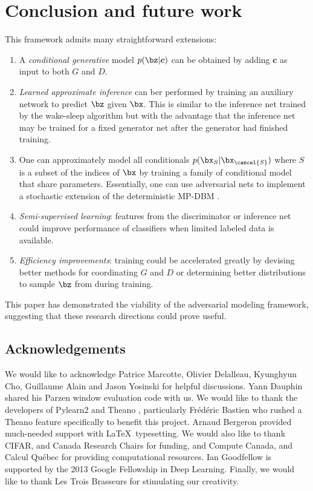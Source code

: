 \section{Conclusion and future work}

This framework admits many straightforward extensions:

\begin{enumerate}
	\item A \emph{conditional generative} model $p(\bz | \boldsymbol{c})$ can be obtained by adding $\boldsymbol{c}$ as input to both $G$ and $D$.
	\item \emph{Learned approximate inference} can ber performed by training an auxiliary network to predict $\bz$ given $\bx$. This is similar to the inference net trained by the wake-sleep algorithm \cite{15_doi:10.1126/science.7761831} but with the advantage that the inference net may be trained for a fixed generator net after the generator had finished training.
	\item One can approximately model all conditionals $p(\bx_S | \bx_{\cancel{S}})$
	where $S$ is a subset of the indices of $\bx$ by training a family of conditional model that share parameters. Essentially, one can use adversarial nets to implement a stochastic extension of the deterministic MP-DBM \cite{11_NIPS2013_0bb4aec1}.
	\item \emph{Semi-supervised learning}: features from the discriminator or inference net could improve performance of classifiers when limited labeled data is available.
	\item \emph{Efficiency improvements}: training could be accelerated greatly by devising better methods for coordinating $G$ and $D$ or determining better distributions to sample $\bz$ from during training.
\end{enumerate}

This paper has demonstrated the viability of the adversarial modeling framework, suggesting that these research directions could prove useful.

\subsection*{Acknowledgements}

We would like to acknowledge Patrice Marcotte, Olivier Delalleau, Kyunghyun Cho, Guillaume Alain and Jason Yosinski for helpful discussions. Yann Dauphin shared his Parzen window evaluation code with us. We would like to thank the developers of Pylearn2 \cite{12_goodfellow2013pylearn2machinelearningresearch} and Theano \cite{7_bergstra-proc-scipy-2010,1_bastien2012theanonewfeaturesspeed}, particularly Frédéric Bastien who rushed a Theano feature specifically to benefit this project. Arnaud Bergeron provided much-needed support with \LaTeX\ typesetting.  We would also like to thank CIFAR, and Canada Research Chairs for funding, and Compute Canada, and Calcul Québec for providing computational resources. Ian Goodfellow is supported by the 2013 Google Fellowship in Deep Learning. Finally, we would like to thank Les Trois Brasseurs for stimulating our creativity.
